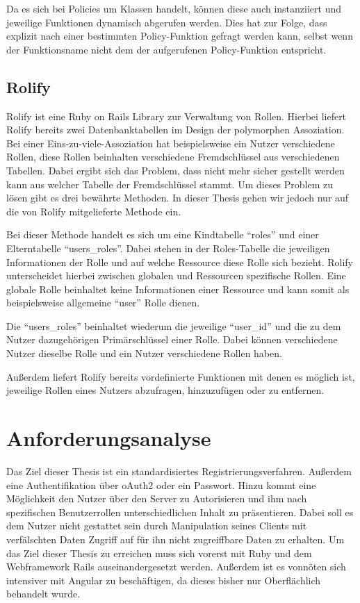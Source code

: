 \documentclass[paper=a4,fontsize=12pt,parskip=half]{scrartcl}
\begin{document}
	Da es sich bei Policies um Klassen handelt, können diese auch instanziiert und jeweilige Funktionen dynamisch abgerufen werden. Dies hat zur Folge, dass explizit nach einer bestimmten Policy-Funktion gefragt werden kann, selbst wenn der Funktionsname nicht dem der aufgerufenen Policy-Funktion entspricht.
	
	\subsection{Rolify}
	\label{sec: rolify}
	Rolify ist eine Ruby on Rails Library zur Verwaltung von Rollen. Hierbei liefert Rolify bereits zwei Datenbanktabellen im Design der polymorphen Assoziation. Bei einer Eins-zu-viele-Assoziation hat beispielsweise ein Nutzer verschiedene Rollen, diese Rollen beinhalten verschiedene Fremdschlüssel aus verschiedenen Tabellen. Dabei ergibt sich das Problem, dass nicht mehr sicher gestellt werden kann aus welcher Tabelle der Fremdschlüssel stammt. Um dieses Problem zu lösen gibt es drei bewährte Methoden. In dieser Thesis gehen wir jedoch nur auf die von Rolify mitgelieferte Methode ein.
	
	Bei dieser Methode handelt es sich um eine Kindtabelle \enquote{roles} und einer Elterntabelle \enquote{users\_roles}. Dabei stehen in der Roles-Tabelle die jeweiligen Informationen der Rolle und auf welche Ressource diese Rolle sich bezieht. Rolify unterscheidet hierbei zwischen globalen und Ressourcen spezifische Rollen. Eine globale Rolle beinhaltet keine Informationen einer Ressource und kann somit als beispielsweise allgemeine \enquote{user} Rolle dienen.
	
	Die \enquote{users\_roles} beinhaltet wiederum die jeweilige \enquote{user\_id} und die zu dem Nutzer dazugehörigen Primärschlüssel einer Rolle. Dabei können verschiedene Nutzer dieselbe Rolle und ein Nutzer verschiedene Rollen haben.
	
	Außerdem liefert Rolify bereits vordefinierte Funktionen mit denen es möglich ist, jeweilige Rollen eines Nutzers abzufragen, hinzuzufügen oder zu entfernen.
	
	\section{Anforderungsanalyse}
	\label{sec: analyze}
	Das Ziel dieser Thesis ist ein standardisiertes Registrierungsverfahren. Außerdem eine Authentifikation über \gls{oAuth2} oder ein Passwort. Hinzu kommt eine Möglichkeit den Nutzer über den Server zu Autorisieren und ihm nach spezifischen Benutzerrollen unterschiedlichen Inhalt zu präsentieren. Dabei soll es dem Nutzer nicht gestattet sein durch Manipulation seines Clients mit verfälschten Daten Zugriff auf für ihn nicht zugreiffbare Daten zu erhalten. Um das Ziel dieser Thesis zu erreichen muss sich vorerst mit Ruby und dem Webframework Rails auseinandergesetzt werden. Außerdem ist es vonnöten sich intensiver mit Angular zu beschäftigen, da dieses bisher nur Oberflächlich behandelt wurde. 
	
\end{document}

